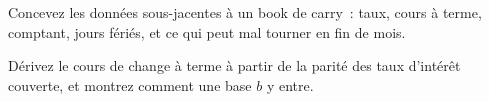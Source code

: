 \begin{interviewq}\label{iq:s2:cross-currency-basis-and-fx-carry:5}
Concevez les données sous-jacentes à un book de carry~: taux, cours à terme, comptant, jours fériés, et ce qui peut mal tourner en fin de mois.
\end{interviewq}

\begin{interviewq}\label{iq:s2:cross-currency-basis-and-fx-carry:6}
Dérivez le cours de change à terme à partir de la parité des taux d'intérêt couverte, et montrez comment une base $b$ y entre.
\end{interviewq}
